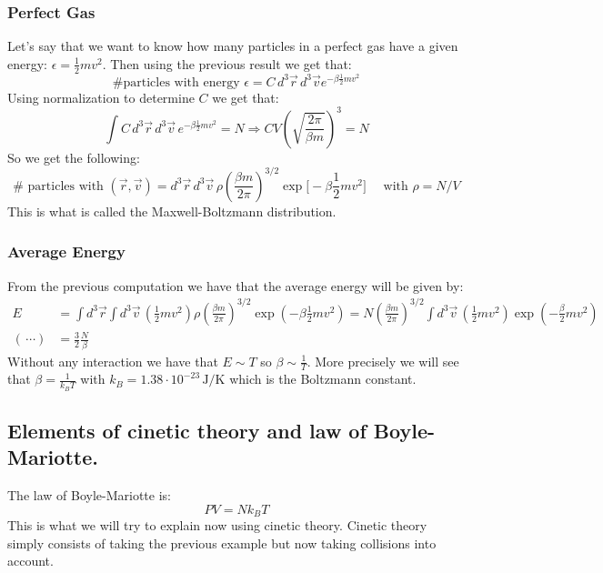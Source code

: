 \documentclass[10pt,a4paper]{book}
\begin{document}
\subsubsection{Perfect Gas}
Let's say that we want to know how many particles in a perfect gas have a given energy: $\epsilon = \frac{1}{2}mv^2$. Then using the previous result we get that:
\[
\# \text{particles with energy } \epsilon = C \, d^3\vec{r} \,d^3 \vec{v} e^{-\beta \frac{1}{2}mv^2}
\]
Using normalization to determine $C$ we get that:
\[
\int C\, d^3 \vec{r}\, d^3 \vec{v} \, e^{-\beta \frac{1}{2}mv^2} = N \Rightarrow CV\left(\sqrt{\frac{2\pi}{\beta m}}\right)^3 = N
\]
So we get the following:
\[
\# \text{ particles with } (\vec{r}, \vec{v}) = d^3 \vec{r}\, d^3 \vec{v}\, \rho \left(\frac{\beta m}{2\pi}\right)^{3/2} \exp\big[-\beta \frac{1}{2}mv^2\big] \quad \text{ with } \rho = N/V
\]
This is what is called the Maxwell-Boltzmann distribution.
\subsubsection{Average Energy}
From the previous computation we have that the average energy will be given by:
\begin{align*}
E &= \int d^3 \vec{r} \int d^3 \vec{v}\, \left(\frac{1}{2}mv^2\right)\rho \left(\frac{\beta m}{2\pi}\right)^{3/2} \exp\left(-\beta \frac{1}{2}mv^2\right) = N\left(\frac{\beta m}{2\pi}\right)^{3/2}\int d^3 \vec{v}\, \left(\frac{1}{2}mv^2\right) \exp\left(-\frac{\beta}{2}mv^2\right)\\
(\,\cdots) &= \frac{3}{2}\frac{N}{\beta}
\end{align*}
Without any interaction we have that $E \sim T$ so $\beta \sim \frac{1}{T}$. More precisely we will see that $\beta = \frac{1}{k_B T}$ with $k_B = 1.38 \cdot 10^{-23} \, \text{J}/\text{K}$ which is the Boltzmann constant.

\subsection{Elements of cinetic theory and law of Boyle-Mariotte.}
The law of Boyle-Mariotte is:
\[
PV = Nk_BT
\]
This is what we will try to explain now using cinetic theory. Cinetic theory simply consists of taking the previous example but now taking collisions into account.
\end{document}

